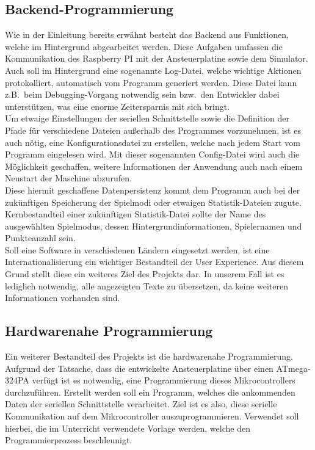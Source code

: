 \subsection{Backend-Programmierung}\label{subsec:backend-programmierung}
Wie in der Einleitung bereits erwähnt besteht das Backend aus Funktionen, welche im Hintergrund abgearbeitet werden.
Diese Aufgaben umfassen die Kommunikation des Raspberry PI mit der Ansteuerplatine sowie dem Simulator.\\
Auch soll im Hintergrund eine sogenannte Log-Datei, welche wichtige Aktionen protokolliert, automatisch vom Programm generiert werden.
Diese Datei kann z.B.\ beim Debugging-Vorgang notwendig sein bzw.\ den Entwickler dabei unterstützen, was eine enorme Zeitersparnis mit sich bringt.\\
Um etwaige Einstellungen der seriellen Schnittstelle sowie die Definition der Pfade für verschiedene Dateien außerhalb des Programmes vorzunehmen, ist es auch nötig, eine Konfigurationsdatei zu erstellen, welche nach jedem Start vom Programm eingelesen wird.
Mit dieser sogenannten Config-Datei wird auch die Möglichkeit geschaffen, weitere Informationen der Anwendung auch nach einem Neustart der Maschine abzurufen.\\
Diese hiermit geschaffene Datenpersistenz kommt dem Programm auch bei der zukünftigen Speicherung der Spielmodi oder etwaigen Statistik-Dateien zugute.
Kernbestandteil einer zukünftigen Statistik-Datei sollte der Name des ausgewählten Spielmodus, dessen Hintergrundinformationen, Spielernamen und Punkteanzahl sein.\\
Soll eine Software in verschiedenen Ländern eingesetzt werden, ist eine Internationalisierung ein wichtiger Bestandteil der User Experience.
Aus diesem Grund stellt diese ein weiteres Ziel des Projekts dar.
In unserem Fall ist es lediglich notwendig, alle angezeigten Texte zu übersetzen, da keine weiteren Informationen vorhanden sind.

\subsection{Hardwarenahe Programmierung}\label{subsec:hardwarenahe-programmierung}
Ein weiterer Bestandteil des Projekts ist die hardwarenahe Programmierung.
Aufgrund der Tatsache, dass die entwickelte Ansteuerplatine über einen ATmega-324PA verfügt ist es notwendig, eine Programmierung dieses Mikrocontrollers durchzuführen.
Erstellt werden soll ein Programm, welches die ankommenden Daten der seriellen Schnittstelle verarbeitet.
Ziel ist es also, diese serielle Kommunikation auf dem Mikrocontroller auszuprogrammieren.
Verwendet soll hierbei, die im Unterricht verwendete Vorlage werden, welche den Programmierprozess beschleunigt.

